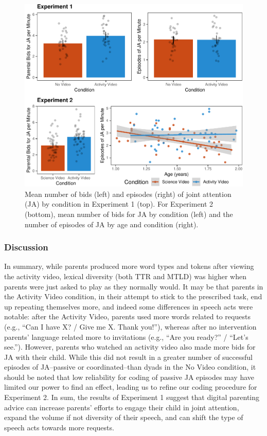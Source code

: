 \documentclass[man,floatsintext]{apa6}
\begin{document}
\begin{figure}[H]

{\centering \includegraphics{figs/fig-JA-1} 

}

\caption{\label{fig:JA} Mean number of bids (left) and episodes (right) of joint attention (JA) by condition in Experiment 1 (top). For Experiment 2 (bottom), mean number of bids for JA by condition (left) and the number of episodes of JA by age and condition (right).}\label{fig:fig-JA}
\end{figure}

\hypertarget{discussion}{%
\subsubsection{Discussion}\label{discussion}}

In summary, while parents produced more word types and tokens after viewing the activity video, lexical diversity (both TTR and MTLD) was higher when parents were just asked to play as they normally would.
It may be that parents in the Activity Video condition, in their attempt to stick to the prescribed task, end up repeating themselves more, and indeed some differences in speech acts were notable:
after the Activity Video, parents used more words related to requests (e.g., \enquote{Can I have X? / Give me X. Thank you!}), whereas after no intervention parents' language related more to invitations (e.g., \enquote{Are you ready?} / \enquote{Let's see.}).
However, parents who watched an activity video also made more bids for JA with their child.
While this did not result in a greater number of successful episodes of JA--passive or coordinated--than dyads in the No Video condition, it should be noted that low reliability for coding of passive JA episodes may have limited our power to find an effect, leading us to refine our coding procedure for Experiment 2.
In sum, the results of Experiment 1 suggest that digital parenting advice can increase parents' efforts to engage their child in joint attention, expand the volume if not diversity of their speech, and can shift the type of speech acts towards more requests.
\end{document}
